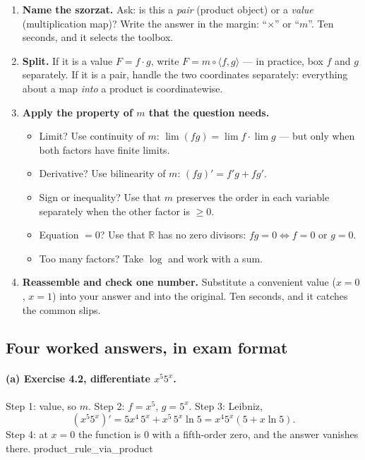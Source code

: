 \documentclass[11pt,a4paper]{article}
\theoremstyle{definition}
\newcommand{\lean}[1]{\textsf{\small #1}}
\begin{document}
\begin{enumerate}[label=\textbf{Step \arabic*.},leftmargin=2.2cm]
\item \textbf{Name the szorzat.}  Ask: is this a \emph{pair} (product object) or a
      \emph{value} (multiplication map)?  Write the answer in the margin: ``$\times$''
      or ``$m$''.  Ten seconds, and it selects the toolbox.
\item \textbf{Split.}  If it is a value $F=f\cdot g$, write $F=m\circ\langle f,g\rangle$ ---
      in practice, box $f$ and $g$ separately.  If it is a pair, handle the two coordinates
      separately: everything about a map \emph{into} a product is coordinatewise.
\item \textbf{Apply the property of $m$ that the question needs.}
      \begin{itemize}[nosep]
      \item Limit? Use continuity of $m$: $\lim(fg)=\lim f\cdot\lim g$ --- but only when both
            factors have finite limits.
      \item Derivative? Use bilinearity of $m$: $(fg)'=f'g+fg'$.
      \item Sign or inequality? Use that $m$ preserves the order in each variable separately
            when the other factor is $\ge 0$.
      \item Equation $=0$? Use that $\mathbb{R}$ has no zero divisors: $fg=0 \iff f=0$ or
            $g=0$.
      \item Too many factors? Take $\log$ and work with a sum.
      \end{itemize}
\item \textbf{Reassemble and check one number.}  Substitute a convenient value
      ($x=0$, $x=1$) into your answer and into the original.  Ten seconds, and it catches
      the common slips.
\end{enumerate}

\subsection{Four worked answers, in exam format}

\paragraph{(a) Exercise 4.2, differentiate $x^5 5^x$.}
Step 1: value, so $m$.  Step 2: $f=x^5$, $g=5^x$.  Step 3: Leibniz,
\[
  (x^5 5^x)' = 5x^4\,5^x + x^5\,5^x\ln 5 = x^4 5^x(5+x\ln 5).
\]
Step 4: at $x=0$ the function is $0$ with a fifth-order zero, and the answer vanishes
there. \hfill\lean{product\_rule\_via\_product}
\end{document}
